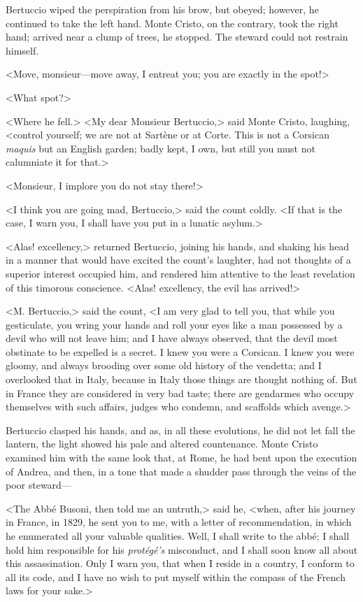  Bertuccio wiped the perspiration from his brow, but obeyed; however, he continued to take the left hand. Monte Cristo, on the contrary, took the right hand; arrived near a clump of trees, he stopped. The steward could not restrain himself. 

 <Move, monsieur—move away, I entreat you; you are exactly in the spot!> 

 <What spot?> 

 <Where he fell.>  <My dear Monsieur Bertuccio,> said Monte Cristo, laughing, <control yourself; we are not at Sartène or at Corte. This is not a Corsican \textit{maquis} but an English garden; badly kept, I own, but still you must not calumniate it for that.> 

 <Monsieur, I implore you do not stay there!> 

 <I think you are going mad, Bertuccio,> said the count coldly. <If that is the case, I warn you, I shall have you put in a lunatic asylum.> 

 <Alas! excellency,> returned Bertuccio, joining his hands, and shaking his head in a manner that would have excited the count's laughter, had not thoughts of a superior interest occupied him, and rendered him attentive to the least revelation of this timorous conscience. <Alas! excellency, the evil has arrived!> 

 <M. Bertuccio,> said the count, <I am very glad to tell you, that while you gesticulate, you wring your hands and roll your eyes like a man possessed by a devil who will not leave him; and I have always observed, that the devil most obstinate to be expelled is a secret. I knew you were a Corsican. I knew you were gloomy, and always brooding over some old history of the vendetta; and I overlooked that in Italy, because in Italy those things are thought nothing of. But in France they are considered in very bad taste; there are gendarmes who occupy themselves with such affairs, judges who condemn, and scaffolds which avenge.> 

 Bertuccio clasped his hands, and as, in all these evolutions, he did not let fall the lantern, the light showed his pale and altered countenance. Monte Cristo examined him with the same look that, at Rome, he had bent upon the execution of Andrea, and then, in a tone that made a shudder pass through the veins of the poor steward— 

 <The Abbé Busoni, then told me an untruth,> said he, <when, after his journey in France, in 1829, he sent you to me, with a letter of recommendation, in which he enumerated all your valuable qualities. Well, I shall write to the abbé; I shall hold him responsible for his \textit{protégé's} misconduct, and I shall soon know all about this assassination. Only I warn you, that when I reside in a country, I conform to all its code, and I have no wish to put myself within the compass of the French laws for your sake.> 

